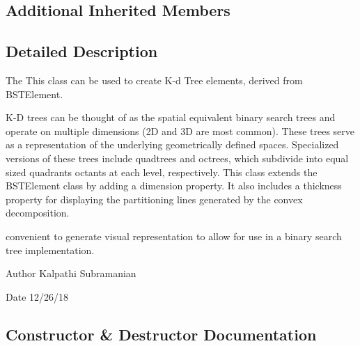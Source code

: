 \subsection*{Additional Inherited Members}


\subsection{Detailed Description}
The This class can be used to create K-\/d Tree elements, derived from B\+S\+T\+Element. 

K-\/D trees can be thought of as the spatial equivalent binary search trees and operate on multiple dimensions (2D and 3D are most common). These trees serve as a representation of the underlying geometrically defined spaces. Specialized versions of these trees include quadtrees and octrees, which subdivide into equal sized quadrants octants at each level, respectively. This class extends the B\+S\+T\+Element class by adding a dimension property. It also includes a thickness property for displaying the partitioning lines generated by the convex decomposition.

convenient to generate visual representation to allow for use in a binary search tree implementation.

\begin{DoxyAuthor}{Author}
Kalpathi Subramanian 
\end{DoxyAuthor}
\begin{DoxyDate}{Date}
12/26/18 
\end{DoxyDate}


\subsection{Constructor \& Destructor Documentation}
\mbox{\label{classbridges_1_1kd__tree__element_1_1_k_d_tree_element_a8a53d645bf60df824cc552ac3d6e95e3}} 
